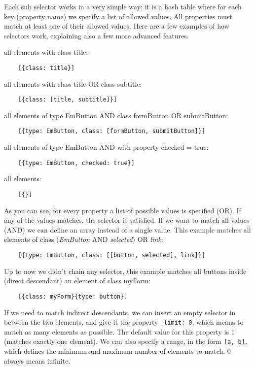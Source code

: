 Each sub selector works in a very simple way: it is a hash table where for each key (property name) we specify a list of allowed values. All properties must match at least one of their allowed values. Here are a few examples of how selectors work, explaining also a few more advanced features.

all elements with class title:
\begin{verbatim}
    [{class: title}]
\end{verbatim}

all elements with class title OR class subtitle:
\begin{verbatim}
    [{class: [title, subtitle]}]
\end{verbatim}

all elements of type EmButton AND class formButton OR submitButton:
\begin{verbatim}
    [{type: EmButton, class: [formButton, submitButton]}]
\end{verbatim}

all elements of type EmButton AND with property checked = true:
\begin{verbatim}
    [{type: EmButton, checked: true}]
\end{verbatim}

all elements:
\begin{verbatim}
    [{}]
\end{verbatim}

As you can see, for every property a list of possible values is specified (OR). If any of the values matches, the selector is satisfied. If we want to match all values (AND) we can define an array instead of a single value. This example matches all elements of class (\textit{EmButton} AND \textit{selected}) OR \textit{link}:
\begin{verbatim}
    [{type: EmButton, class: [[button, selected], link]}]
\end{verbatim}

Up to now we didn't chain any selector, this example matches all buttons inside (direct descendant) an element of class myForm:
\begin{verbatim}
    [{class: myForm}{type: button}]
\end{verbatim}

If we need to match indirect descendants, we can insert an empty selector in between the two elements, and give it the property \verb|_limit: 0|, which means to match as many elements as possible. The default value for this property is 1 (matches exactly one element). We can also specify a range, in the form \verb|[a, b]|, which defines the minimum and maximum number of elements to match. 0 always means infinite.

